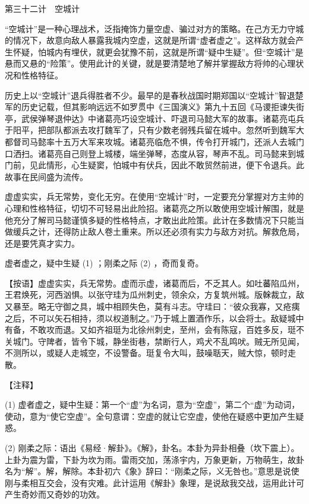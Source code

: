 \documentclass[12pt,UTF8]{ctexbook}
\begin{document}
第三十二计　空城计


“空城计”是一种心理战术，泛指掩饰力量空虚、骗过对方的策略。在己方无力守城的情况下，故意向敌人暴露我城内空虚，这就是所谓“虚者虚之”。这样敌方就会产生怀疑，怕城内有埋伏，就更会犹豫不前，这就是所谓“疑中生疑”。但“空城计”是悬而又悬的“险策”。使用此计的关键，就是要清楚地了解并掌握敌方将帅的心理状况和性格特征。

历史上以“空城计”退兵得胜者不少。最早的是春秋战国时期郑国以“空城计”智退楚军的历史记载，但其影响远远不如罗贯中《三国演义》第九十五回《马谡拒谏失街亭，武侯弹琴退仲达》中诸葛亮巧设空城计、吓退司马懿大军的故事。诸葛亮屯兵于阳平，把部队都派去攻打魏军了，只有少数老弱残兵留在城中。忽然听到魏军大都督司马懿率十五万大军来攻城。诸葛亮临危不惧，传令打开城门，还派人去城门口洒扫。诸葛亮自己则登上城楼，端坐弹琴，态度从容，琴声不乱。司马懿来到城门前，见此情形，心生疑窦，怕城中有伏兵，因此不敢贸然前进，便下令退兵。此故事在民间盛为流传。

虚虚实实，兵无常势，变化无穷。在使用“空城计”时，一定要充分掌握对方主帅的心理和性格特征，切切不可轻易出此险招。诸葛亮之所以敢使用空城计解围，就是他充分了解司马懿谨慎多疑的性格特点，才敢出此险策。此计在多数情况下只能当做缓兵之计，还得防止敌人卷土重来。所以还必须有实力与敌方对抗。解救危局，还是要凭真才实力。





虚者虚之，疑中生疑 (1) ；刚柔之际 (2) ，奇而复奇。

【按语】虚虚实实，兵无常势。虚而示虚，诸葛而后，不乏其人。如吐蕃陷瓜州，王君焕死，河西汹惧。以张守珪为瓜州刺史，领余众，方复筑州城。版榦裁立，敌又暴至。略无守御之具，城中相顾失色，莫有斗志。守珪曰：“彼众我寡，又疮痍之后，不可以矢石相持，须以权道制之。”乃于城上置酒作乐，以会将士。敌疑城中有备，不敢攻而退。又如齐祖珽为北徐州刺史，至州，会有陈寇，百姓多反，珽不关城门。守陴者，皆令下城，静坐街巷，禁断行人，鸡犬不乱鸣吠。贼无所见闻，不测所以，或疑人走城空，不设警备。珽复令大叫，鼓噪聒天，贼大惊，顿时走散。





【注释】


(1) 虚者虚之，疑中生疑：第一个“虚”为名词，意为“空虚”，第二个“虚”为动词，使动，意为“使它空虚”。全句意谓：空虚的就让它空虚，使他在疑惑中更加产生疑惑。

(2) 刚柔之际：语出《易经·解卦》。《解》，卦名。本卦为异卦相叠（坎下震上）。上卦为震为雷，下卦为坎为雨。雷雨交加，荡涤宇内，万象更新，万物萌生，故卦名为“解”。解，解除。本卦初六《象》辞曰：“刚柔之际，义无咎也。”意思是说使刚与柔相互交会，没有灾难。此计运用《解卦》象理，是说敌我交战，运用此计可产生奇妙而又奇妙的功效。
\end{document}
